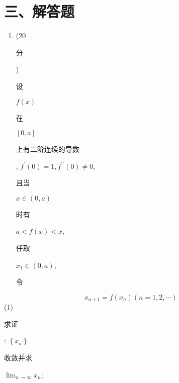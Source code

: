 \documentclass[10pt]{article}
\begin{document}
\section{三、解答题}
\begin{enumerate}
  \item (20 \begin{CJK}{UTF8}{mj}分\end{CJK}) \begin{CJK}{UTF8}{mj}设\end{CJK} $f(x)$ \begin{CJK}{UTF8}{mj}在\end{CJK} $[0, a]$ \begin{CJK}{UTF8}{mj}上有二阶连续的导数\end{CJK}, $f^{\prime}(0)=1, f^{\prime \prime}(0) \neq 0$, \begin{CJK}{UTF8}{mj}且当\end{CJK} $x \in(0, a)$ \begin{CJK}{UTF8}{mj}时有\end{CJK} $a<f(x)<x$, \begin{CJK}{UTF8}{mj}任取\end{CJK} $x_{1} \in(0, a)$, \begin{CJK}{UTF8}{mj}令\end{CJK}
\end{enumerate}
$$
x_{n+1}=f\left(x_{n}\right)(n=1,2, \cdots)
$$
(1) \begin{CJK}{UTF8}{mj}求证\end{CJK}: $\left\{x_{n}\right\}$ \begin{CJK}{UTF8}{mj}收敛并求\end{CJK} $\lim _{n \rightarrow \infty} x_{n}$;
\end{document}
